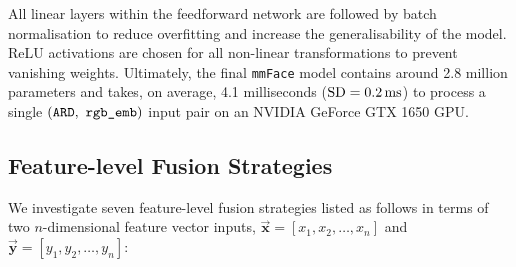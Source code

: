 \documentclass{mpaper}
\begin{document}
All linear layers within the feedforward network are followed by batch normalisation to reduce overfitting and increase the generalisability of the model. ReLU activations are chosen for all non-linear transformations to prevent vanishing weights. Ultimately, the final \texttt{mmFace} model contains around 2.8 million parameters and takes, on average, 4.1 milliseconds ($\text{SD}=\text{\qty{0.2}{\ms}}$) to process a single $(\mathtt{ARD}, \  \verb|rgb_emb|)$ input pair on an NVIDIA GeForce GTX 1650 GPU.


\subsection{Feature-level Fusion Strategies}
We investigate seven feature-level fusion strategies listed as follows in terms of two $n$-dimensional feature vector inputs, $\bm{\vec{x}} = [x_1, x_2, \ldots, x_n]$ and $\bm{\vec{y}} = [y_1, y_2, \ldots, y_n]$:
\vspace{-0.1cm}
\end{document}
